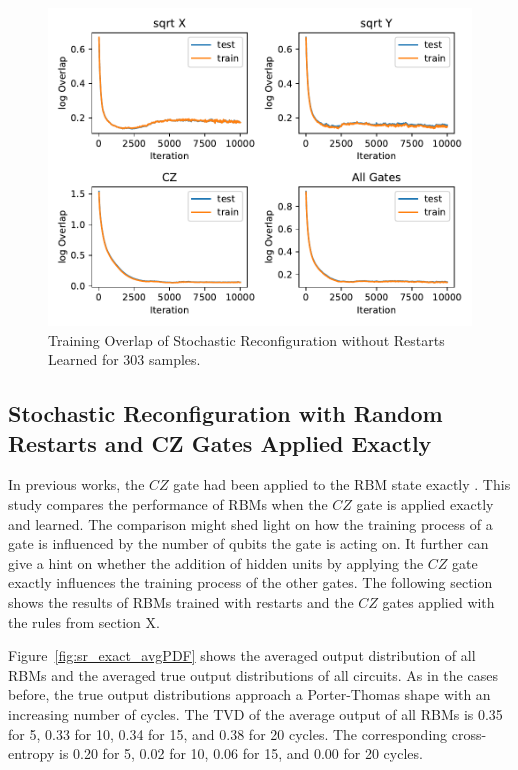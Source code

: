 \begin{figure}[H]
  \centering
  \includegraphics[width=\textwidth]{figures/results/SR-no-restarts-learned/avgOverlap_303.pdf}
  \caption[Training Overlap of Stochastic Reconfiguration without Restarts Learned]{Training 
  Overlap of Stochastic Reconfiguration without Restarts Learned for 303 samples.}
  \label{fig:sr_no_restarts_overlap_303}
\end{figure}

\newpage

\subsection{Stochastic Reconfiguration with Random Restarts and CZ Gates Applied Exactly}

In previous works, the $CZ$ gate had been applied to the RBM state exactly \cite{jnsson2018neuralnetwork}. This study compares 
the performance of RBMs when the $CZ$ gate is applied exactly and learned. The comparison might shed
light on how the training process of a gate is influenced by the number of qubits the gate 
is acting on. It further can give a hint on whether the addition of hidden units by applying the $CZ$
gate exactly influences the training process of the other gates.
The following section shows the results of RBMs trained with restarts and the $CZ$ gates applied 
with the rules from section X.

Figure~\ref{fig:sr_exact_avgPDF} shows the averaged output distribution of all RBMs and
the averaged true output distributions of all circuits. As in the cases before, the 
true output distributions approach a Porter-Thomas shape with an increasing number of cycles.
The TVD of the average output of all RBMs 
is 0.35 for 5, 0.33 for 10, 0.34 for 15, and 0.38 for 20 cycles. The corresponding cross-entropy is 
0.20 for 5, 0.02 for 10, 0.06 for 15, and 0.00 for 20 cycles.

